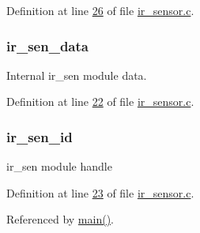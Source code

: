 Definition at line \hyperlink{a00045_source_l00026}{26} of file \hyperlink{a00045_source}{ir\+\_\+sensor.\+c}.

\hypertarget{a00045_a73dfacb46242746440accc76c7ef710d}{
\subsubsection[{ir\+\_\+sen\+\_\+data}]{ ir\+\_\+sen\+\_\+data}}\label{a00045_a73dfacb46242746440accc76c7ef710d}


Internal ir\+\_\+sen module data. 



Definition at line \hyperlink{a00045_source_l00022}{22} of file \hyperlink{a00045_source}{ir\+\_\+sensor.\+c}.

\hypertarget{a00045_a624782f67b3870f0dde83528770ef5fc}{
\subsubsection[{ir\+\_\+sen\+\_\+id}]{ ir\+\_\+sen\+\_\+id}}\label{a00045_a624782f67b3870f0dde83528770ef5fc}


ir\+\_\+sen module handle 



Definition at line \hyperlink{a00045_source_l00023}{23} of file \hyperlink{a00045_source}{ir\+\_\+sensor.\+c}.



Referenced by \hyperlink{a00048_source_l00080}{main()}.


